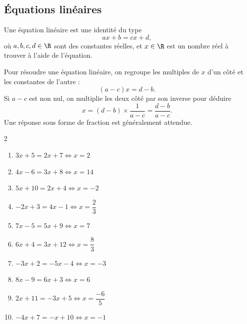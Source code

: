 \subsection*{Équations linéaires}

\begin{dfn}
	Une équation linéaire est une identité du type
		\[ a  x + b = c  x + d, \]
	où $a, b, c, d \in \R$ sont des constantes réelles, et $x \in \R$ est un nombre réel à trouver à l'aide de l'équation.
\end{dfn}

\begin{remarque}
	Pour résoudre une équation linéaire, on regroupe les multiples de $x$ d'un côté et les constantes de l'autre : 
		\[ (a-c)  x = d - b. \]
	Si $a-c$ est non nul, on multiplie les deux côté par son inverse pour déduire 
		\[ x = (d-b)\times \dfrac{1}{a-c} =  \dfrac{d-b}{a-c}. \]
	Une réponse sous forme de fraction est généralement attendue.
\end{remarque}

\newpage

{
	\begin{multicols}{2}
	\begin{enumerate}[itemsep=10pt]
		\item $3x + 5 = 2x + 7 \iff x = 2$
		\item $4x - 6 = 3x + 8 \iff x = 14$
		\item $5x + 10 = 2x + 4 \iff x = -2$
		\item $-2x + 3 = 4x - 1 \iff x = \dfrac{2}{3}$
		\item $7x - 5 = 5x + 9 \iff x = 7$
		\item $6x + 4 = 3x + 12 \iff x = \dfrac{8}{3}$
		\item $-3x + 2 = -5x - 4 \iff x = -3$
		\item $8x - 9 = 6x + 3 \iff x = 6$
		\item $2x + 11 = -3x + 5 \iff x = \dfrac{-6}{5}$
		\item $-4x + 7 = -x + 10 \iff x = -1$
	\end{enumerate}
	\end{multicols}
}

